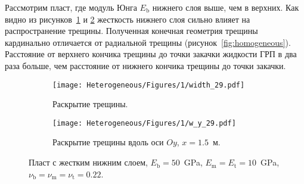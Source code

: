 Рассмотрим пласт, где модуль Юнга $E_\text{b}$ нижнего слоя выше, чем в верхних. Как видно из рисунков~\ref{fig:heterogeneous-2-layer-planar} и \ref{fig:heterogeneous-2-layer-slice} жесткость нижнего слоя сильно влияет на распространение трещины. Полученная конечная геометрия трещины кардинально отличается от радиальной трещины (рисунок~\ref{fig:homogeneous}). Расстояние от верхнего кончика трещины до точки закачки жидкости ГРП в два раза больше, чем расстояние от нижнего кончика трещины до точки закачки.
\begin{figure}[htbp]
    \centering
    \begin{subfigure}[t]{0.4\textwidth}
        \centering
        \texttt{[image: Heterogeneous/Figures/1/width\_29.pdf]}
        \caption{Раскрытие трещины.}
        \label{fig:heterogeneous-2-layer-planar}
    \end{subfigure}
    \hfill 
    \begin{subfigure}[t]{0.55\textwidth}
        \centering
        \texttt{[image: Heterogeneous/Figures/1/w\_y\_29.pdf]}
        \caption{Раскрытие трещины вдоль оси $Oy$, $x=1.5$~м.}
        \label{fig:heterogeneous-2-layer-slice}
    \end{subfigure}
    \caption{Пласт с жестким нижним слоем, $E_\text{b} = 50$~GPa, $E_\text{m} = E_\text{t} = 10$~GPa, $\nu_\text{b} = \nu_\text{m} = \nu_\text{t} = 0.22$.}
    \label{fig:heterogeneous-2-layer}
\end{figure}

